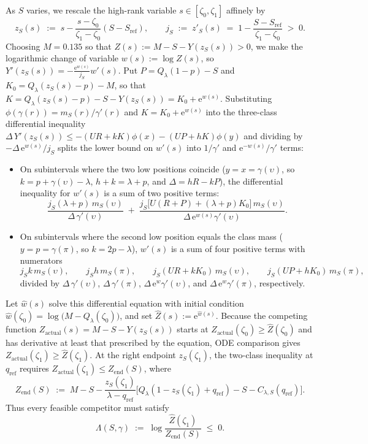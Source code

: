 \documentclass[11pt]{article}
\numberwithin{equation}{section}
\theoremstyle{plain}
\theoremstyle{definition}
\newcommand{\1}{\mathbf{1}}
\begin{document}
As $S$ varies, we rescale the high-rank variable $s \in [\zeta_0, \zeta_1]$ affinely by
\[
  z_S(s) \;:=\; s - \frac{s - \zeta_0}{\zeta_1 - \zeta_0}(S - S_{\mathrm{ref}}),
  \qquad
  j_S \;:=\; z'_S(s) \;=\; 1 - \frac{S - S_{\mathrm{ref}}}{\zeta_1 - \zeta_0} \;>\; 0.
\]
Choosing $M = 0.135$ so that $Z(s) := M - S - Y(z_S(s)) > 0$, we make the logarithmic change of variable $w(s) := \log Z(s)$, so $Y'(z_S(s)) = -\frac{\mathrm{e}^{w(s)}}{j_S}w'(s)$. Put $P = Q_\lambda(1 - p) - S$ and $K_0 = Q_\lambda(z_S(s) - p) - M$, so that $K = Q_\lambda(z_S(s) - p) - S - Y(z_S(s)) = K_0 + \mathrm{e}^{w(s)}$. Substituting $\phi(\gamma(r)) = m_S(r)/\gamma'(r)$ and $K = K_0 + \mathrm{e}^{w(s)}$ into the three-class differential inequality $\Delta\,Y'(z_S(s)) \le -(U R + k K)\phi(x) - (U P + h K)\phi(y)$ and dividing by $-\Delta\,\mathrm{e}^{w(s)}/j_S$ splits the lower bound on $w'(s)$ into $1/\gamma'$ and $\mathrm{e}^{-w(s)}/\gamma'$ terms:
\begin{itemize}
  \item On subintervals where the two low positions coincide ($y = x = \gamma(\upsilon)$, so $k = p + \gamma(\upsilon) - \lambda$, $h + k = \lambda + p$, and $\Delta = h R - k P$), the differential inequality for $w'(s)$ is a sum of two positive terms:
  \[
    \frac{j_S(\lambda + p)\,m_S(\upsilon)}{\Delta\,\gamma'(\upsilon)}
    \;+\;
    \frac{j_S\bigl[U(R + P) + (\lambda + p)K_0\bigr]\,m_S(\upsilon)}{\Delta\,\mathrm{e}^{w(s)} \gamma'(\upsilon)}.
  \]
  \item On subintervals where the second low position equals the class mass ($y = p = \gamma(\pi)$, so $k = 2p - \lambda$), $w'(s)$ is a sum of four positive terms with numerators
  \[
    j_S k\,m_S(\upsilon), \qquad j_S h\,m_S(\pi), \qquad j_S(U R + k K_0)\,m_S(\upsilon), \qquad j_S(U P + h K_0)\,m_S(\pi),
  \]
  divided by $\Delta\,\gamma'(\upsilon)$, $\Delta\,\gamma'(\pi)$, $\Delta\,\mathrm{e}^w \gamma'(\upsilon)$, and $\Delta\,\mathrm{e}^w \gamma'(\pi)$, respectively.
\end{itemize}
Let $\widehat{w}(s)$ solve this differential equation with initial condition $\widehat{w}(\zeta_0) = \log\bigl(M - Q_\lambda(\zeta_0)\bigr)$, and set $\widehat{Z}(s) := \mathrm{e}^{\widehat{w}(s)}$. Because the competing function $Z_{\mathrm{actual}}(s) = M - S - Y(z_S(s))$ starts at $Z_{\mathrm{actual}}(\zeta_0) \ge \widehat{Z}(\zeta_0)$ and has derivative at least that prescribed by the equation, ODE comparison gives $Z_{\mathrm{actual}}(\zeta_1) \ge \widehat{Z}(\zeta_1)$. At the right endpoint $z_S(\zeta_1)$, the two-class inequality at $q_{\mathrm{ref}}$ requires $Z_{\mathrm{actual}}(\zeta_1) \le Z_{\mathrm{end}}(S)$, where
\[
  Z_{\mathrm{end}}(S) \;:=\; M - S - \frac{z_S(\zeta_1)}{\lambda - q_{\mathrm{ref}}}\bigl[Q_\lambda(1 - z_S(\zeta_1) + q_{\mathrm{ref}}) - S - C_{\lambda, S}(q_{\mathrm{ref}})\bigr].
\]
Thus every feasible competitor must satisfy
\begin{equation}
  \Lambda(S, \gamma) \;:=\; \log\frac{\widehat{Z}(\zeta_1)}{Z_{\mathrm{end}}(S)} \;\le\; 0.
  \label{eq:log-comparison}
\end{equation}
\end{document}
